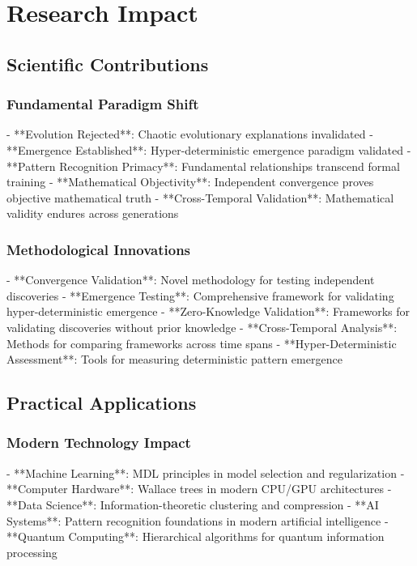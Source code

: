 \section{Research Impact}

\subsection{Scientific Contributions}

\subsubsection{Fundamental Paradigm Shift}
- **Evolution Rejected**: Chaotic evolutionary explanations invalidated
- **Emergence Established**: Hyper-deterministic emergence paradigm validated
- **Pattern Recognition Primacy**: Fundamental relationships transcend formal training
- **Mathematical Objectivity**: Independent convergence proves objective mathematical truth
- **Cross-Temporal Validation**: Mathematical validity endures across generations

\subsubsection{Methodological Innovations}
- **Convergence Validation**: Novel methodology for testing independent discoveries
- **Emergence Testing**: Comprehensive framework for validating hyper-deterministic emergence
- **Zero-Knowledge Validation**: Frameworks for validating discoveries without prior knowledge
- **Cross-Temporal Analysis**: Methods for comparing frameworks across time spans
- **Hyper-Deterministic Assessment**: Tools for measuring deterministic pattern emergence

\subsection{Practical Applications}

\subsubsection{Modern Technology Impact}
- **Machine Learning**: MDL principles in model selection and regularization
- **Computer Hardware**: Wallace trees in modern CPU/GPU architectures
- **Data Science**: Information-theoretic clustering and compression
- **AI Systems**: Pattern recognition foundations in modern artificial intelligence
- **Quantum Computing**: Hierarchical algorithms for quantum information processing

